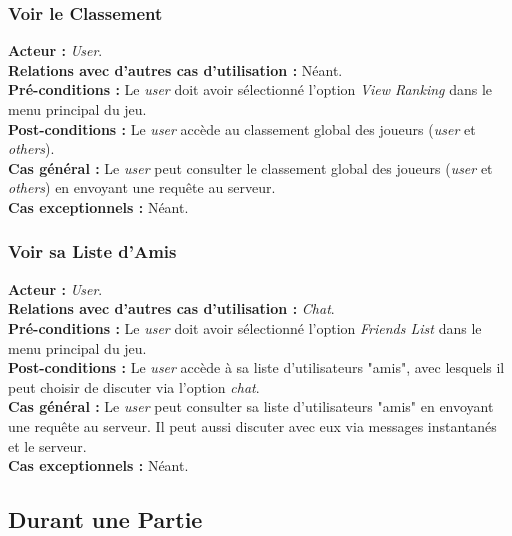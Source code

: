 \documentclass[10pt, a4paper]{article}
\begin{document}
\subsubsection{Voir le Classement}
\textbf{Acteur :} \textit{User}.\\
\textbf{Relations avec d'autres cas d'utilisation :} Néant.\\
\textbf{Pré-conditions :} Le \textit{user} doit avoir sélectionné l'option \textit{View Ranking} dans le menu principal du jeu.\\
\textbf{Post-conditions :} Le \textit{user} accède au classement global des joueurs (\textit{user} et \textit{others}).\\
\textbf{Cas général :} Le \textit{user} peut consulter le classement global des joueurs (\textit{user} et \textit{others}) en envoyant une requête au serveur.\\
\textbf{Cas exceptionnels :} Néant.

\subsubsection{Voir sa Liste d'Amis}
\textbf{Acteur :} \textit{User}.\\
\textbf{Relations avec d'autres cas d'utilisation :} \textit{Chat}.\\
\textbf{Pré-conditions :} Le \textit{user} doit avoir sélectionné l'option \textit{Friends List} dans le menu principal du jeu.\\
\textbf{Post-conditions :} Le \textit{user} accède à sa liste d'utilisateurs "amis", avec lesquels il peut choisir de discuter via l'option \textit{chat}.\\
\textbf{Cas général :} Le \textit{user} peut consulter sa liste d'utilisateurs "amis" en envoyant une requête au serveur. Il peut aussi discuter avec eux via messages instantanés et le serveur.\\
\textbf{Cas exceptionnels :} Néant.


\subsection{Durant une Partie}
\end{document}
